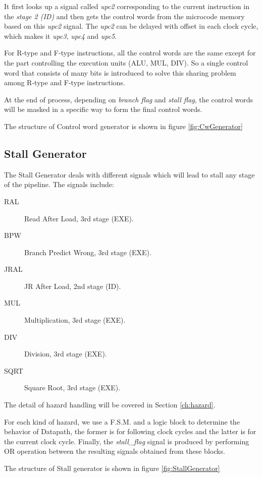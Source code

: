 It first looks up a signal called {\it upc2} corresponding to the current instruction in the {\it stage 2 (ID)} and then gets the control
words from the microcode memory based on this {\it upc2} signal. The {\it upc2} can be delayed with offset in each clock cycle,
which makes it {\it upc3}, {\it upc4} and {\it upc5}.

For R-type and F-type instructions, all the control words are the same
except for the part controlling the execution units (ALU, MUL, DIV).
So a single control word that consists of many bits is introduced to solve this sharing problem among R-type
and F-type instructions.

At the end of process, depending on {\it branch flag} and {\it stall flag}, the control words will be masked in
a specific way to form the final control words.

The structure of Control word generator is shown in figure \ref{fig:CwGenerator}

\subsection[Stall Generator]{Stall Generator}
The Stall Generator deals with different signals which will lead to stall any stage
of the pipeline. The signals include:

\begin{description}
  \item[RAL] Read After Load, 3rd stage (EXE).
  \item[BPW] Branch Predict Wrong, 3rd stage (EXE).
  \item[JRAL] JR After Load, 2nd stage (ID).
  \item[MUL] Multiplication, 3rd stage (EXE).
  \item[DIV] Division, 3rd stage (EXE).
  \item[SQRT] Square Root, 3rd stage (EXE).
\end{description}

The detail of hazard handling will be covered in Section \ref{ch:hazard}.

For each kind of hazard, we use a F.S.M. and a logic block to determine the behavior of
Datapath, the former is for following clock cycles and the latter is for the current clock
cycle. Finally, the {\it stall\_flag} signal is produced by performing OR operation between
the resulting signals obtained from these blocks.

The structure of Stall generator is shown in figure \ref{fig:StallGenerator}


